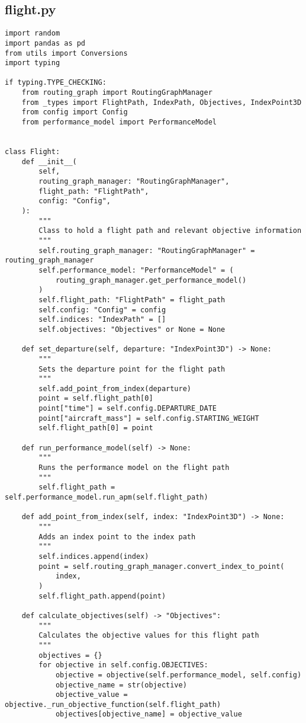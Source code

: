 \subsection{flight.py}
\begin{verbatim}
import random
import pandas as pd
from utils import Conversions
import typing

if typing.TYPE_CHECKING:
    from routing_graph import RoutingGraphManager
    from _types import FlightPath, IndexPath, Objectives, IndexPoint3D
    from config import Config
    from performance_model import PerformanceModel


class Flight:
    def __init__(
        self,
        routing_graph_manager: "RoutingGraphManager",
        flight_path: "FlightPath",
        config: "Config",
    ):
        """
        Class to hold a flight path and relevant objective information
        """
        self.routing_graph_manager: "RoutingGraphManager" = routing_graph_manager
        self.performance_model: "PerformanceModel" = (
            routing_graph_manager.get_performance_model()
        )
        self.flight_path: "FlightPath" = flight_path
        self.config: "Config" = config
        self.indices: "IndexPath" = []
        self.objectives: "Objectives" or None = None

    def set_departure(self, departure: "IndexPoint3D") -> None:
        """
        Sets the departure point for the flight path
        """
        self.add_point_from_index(departure)
        point = self.flight_path[0]
        point["time"] = self.config.DEPARTURE_DATE
        point["aircraft_mass"] = self.config.STARTING_WEIGHT
        self.flight_path[0] = point

    def run_performance_model(self) -> None:
        """
        Runs the performance model on the flight path
        """
        self.flight_path = self.performance_model.run_apm(self.flight_path)

    def add_point_from_index(self, index: "IndexPoint3D") -> None:
        """
        Adds an index point to the index path
        """
        self.indices.append(index)
        point = self.routing_graph_manager.convert_index_to_point(
            index,
        )
        self.flight_path.append(point)

    def calculate_objectives(self) -> "Objectives":
        """
        Calculates the objective values for this flight path
        """
        objectives = {}
        for objective in self.config.OBJECTIVES:
            objective = objective(self.performance_model, self.config)
            objective_name = str(objective)
            objective_value = objective._run_objective_function(self.flight_path)
            objectives[objective_name] = objective_value


\end{verbatim}
